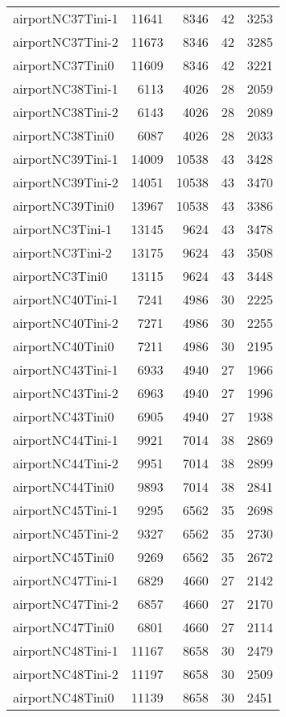 \begin{longtable}{lrrrr}
airportNC37Tini-1 & 11641 & 8346 & 42 & 3253 \\
airportNC37Tini-2 & 11673 & 8346 & 42 & 3285 \\
airportNC37Tini0 & 11609 & 8346 & 42 & 3221 \\
airportNC38Tini-1 & 6113 & 4026 & 28 & 2059 \\
airportNC38Tini-2 & 6143 & 4026 & 28 & 2089 \\
airportNC38Tini0 & 6087 & 4026 & 28 & 2033 \\
airportNC39Tini-1 & 14009 & 10538 & 43 & 3428 \\
airportNC39Tini-2 & 14051 & 10538 & 43 & 3470 \\
airportNC39Tini0 & 13967 & 10538 & 43 & 3386 \\
airportNC3Tini-1 & 13145 & 9624 & 43 & 3478 \\
airportNC3Tini-2 & 13175 & 9624 & 43 & 3508 \\
airportNC3Tini0 & 13115 & 9624 & 43 & 3448 \\
airportNC40Tini-1 & 7241 & 4986 & 30 & 2225 \\
airportNC40Tini-2 & 7271 & 4986 & 30 & 2255 \\
airportNC40Tini0 & 7211 & 4986 & 30 & 2195 \\
airportNC43Tini-1 & 6933 & 4940 & 27 & 1966 \\
airportNC43Tini-2 & 6963 & 4940 & 27 & 1996 \\
airportNC43Tini0 & 6905 & 4940 & 27 & 1938 \\
airportNC44Tini-1 & 9921 & 7014 & 38 & 2869 \\
airportNC44Tini-2 & 9951 & 7014 & 38 & 2899 \\
airportNC44Tini0 & 9893 & 7014 & 38 & 2841 \\
airportNC45Tini-1 & 9295 & 6562 & 35 & 2698 \\
airportNC45Tini-2 & 9327 & 6562 & 35 & 2730 \\
airportNC45Tini0 & 9269 & 6562 & 35 & 2672 \\
airportNC47Tini-1 & 6829 & 4660 & 27 & 2142 \\
airportNC47Tini-2 & 6857 & 4660 & 27 & 2170 \\
airportNC47Tini0 & 6801 & 4660 & 27 & 2114 \\
airportNC48Tini-1 & 11167 & 8658 & 30 & 2479 \\
airportNC48Tini-2 & 11197 & 8658 & 30 & 2509 \\
airportNC48Tini0 & 11139 & 8658 & 30 & 2451 \\

\end{longtable}
